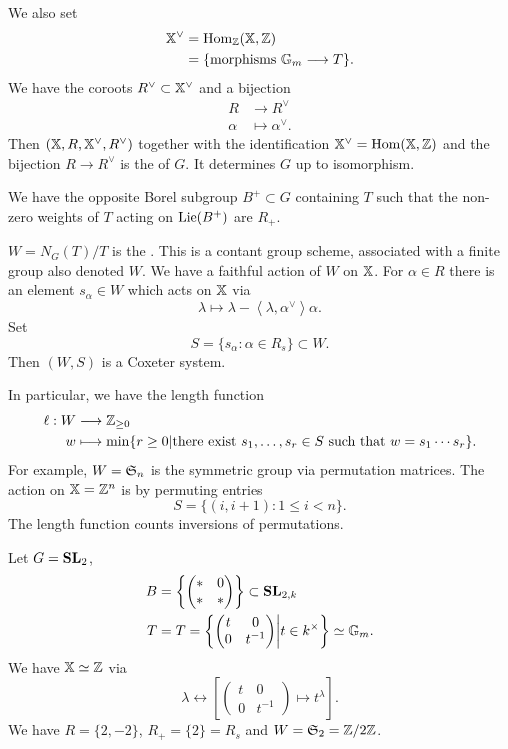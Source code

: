 We also set
\begin{align*}
	\XX^{\vee} &= \Hom_\Z(\XX,\Z) \\
		   &= \{\text{morphisms }\Gm\to T\} .
\end{align*}
We have the coroots $R^{\vee}\subset \XX^{\vee}$ and a bijection
\begin{align*}
	R &\longrightarrow R^{\vee} \\
	\alpha &\longmapsto \alpha ^{\vee}.
\end{align*}
Then $(\XX,R,\XX^{\vee},R^{\vee})$ together with the identification $\XX^{\vee}=\Hom(\XX,\Z)$ and the bijection $R\to R^{\vee}$ is the  of $G$. It determines $G$ up to isomorphism.

We have the opposite Borel subgroup $B^{+}\subset G$ containing $T$ such that the non-zero weights of $T$ acting on $\Lie(B^{+})$ are $R_+$.

$W=N_G(T) / T$ is the . This is a contant group scheme, associated with a finite group also denoted $W$. We have a faithful action of $W$ on $\XX$. For $\alpha\in R$ there is an element $s_\alpha\in W$ which acts on $\XX$ via
\[
\lambda \mapsto \lambda - \left<\lambda,\alpha ^{\vee} \right>\alpha.
\] 
Set
\[
S = \{s_\alpha : \alpha\in R_s\} \subset W.
\] 
Then $(W,S)$ is a Coxeter system.

In particular, we have the length function
\begin{align*}
	\ell: W &\longrightarrow \Z_{\ge 0} \\
	w &\longmapsto \min \{r\ge 0 | \text{there exist }s_1,\dots,s_r\in S\text{ such that }w=s_1\cdots s_r\} .	
\end{align*}
For example, $W=\S_n$ is the symmetric group via permutation matrices. The action on $\XX=\Z^{n}$ is by permuting entries
\[
S = \{(i,i+1):1\le i<n\} .
\] 
The length function counts inversions of permutations.

\begin{example}
	Let $G=\SL_2$,
	\begin{align*}
		B &= \left\{ \begin{pmatrix} * & 0 \\ * & * \end{pmatrix}  \right\} \subset \SL_{2,k} \\
		T &= T = \left\{ \begin{pmatrix} t & 0 \\ 0 & t^{-1} \end{pmatrix} \middle| t\in k^{\times } \right\} \isoto \Gm.
	\end{align*}
	We have $\XX\isoto \Z$ via
	\[
		\lambda \leftrightarrow \left[ \begin{pmatrix} t & 0 \\ 0 & t^{-1} \end{pmatrix} \mapsto t ^{\lambda} \right] .
	\] 
	We have $R=\{2,-2\} $, $R_+=\{2\} =R_s$ and $W=\S_2=\Z /2\Z$.
\end{example}

